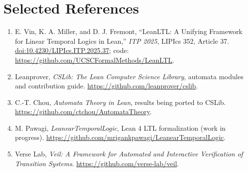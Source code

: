 \documentclass[10pt,a4paper]{article}
\begin{document}
\section{Selected References}
\begin{enumerate}[leftmargin=1.5em,itemsep=0.18em,topsep=0.2em]
  \item E. Vin, K. A. Miller, and D. J. Fremont, ``LeanLTL: A Unifying Framework
        for Linear Temporal Logics in Lean,'' \emph{ITP 2025}, LIPIcs 352,
        Article 37. \href{https://doi.org/10.4230/LIPIcs.ITP.2025.37}{doi:10.4230/LIPIcs.ITP.2025.37};
        code: \url{https://github.com/UCSCFormalMethods/LeanLTL}.
  \item Leanprover, \emph{CSLib: The Lean Computer Science Library}, automata
        modules and contribution guide. \url{https://github.com/leanprover/cslib}.
  \item C.-T. Chou, \emph{Automata Theory in Lean}, results being ported to CSLib.
        \url{https://github.com/ctchou/AutomataTheory}.
  \item M. Pawagi, \emph{LeanearTemporalLogic}, Lean 4 LTL formalization (work in
        progress). \url{https://github.com/mrigankpawagi/LeanearTemporalLogic}.
  \item Verse Lab, \emph{Veil: A Framework for Automated and Interactive
        Verification of Transition Systems}. \url{https://github.com/verse-lab/veil}.
\end{enumerate}
\end{document}

